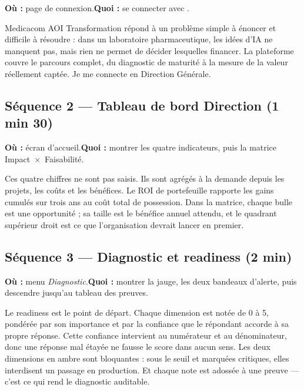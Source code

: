 \textbf{Où :} page de connexion.\quad\textbf{Quoi :} se connecter avec
.

\begin{oral}
Medicacom AOI Transformation répond à un problème simple à énoncer et difficile à
résoudre : dans un laboratoire pharmaceutique, les idées d'IA ne manquent pas, mais rien
ne permet de décider lesquelles financer. La plateforme couvre le parcours complet, du
diagnostic de maturité à la mesure de la valeur réellement captée. Je me connecte en
Direction Générale.
\end{oral}

\subsection*{Séquence 2 — Tableau de bord Direction (1 min 30)}

\textbf{Où :} écran d'accueil.\quad\textbf{Quoi :} montrer les quatre indicateurs, puis
la matrice Impact~$\times$~Faisabilité.

\begin{oral}
Ces quatre chiffres ne sont pas saisis. Ils sont agrégés à la demande depuis les
projets, les coûts et les bénéfices. Le ROI de portefeuille rapporte les gains cumulés
sur trois ans au coût total de possession. Dans la matrice, chaque bulle est une
opportunité ; sa taille est le bénéfice annuel attendu, et le quadrant supérieur droit
est ce que l'organisation devrait lancer en premier.
\end{oral}

\subsection*{Séquence 3 — Diagnostic et readiness (2 min)}

\textbf{Où :} menu \emph{Diagnostic}.\quad\textbf{Quoi :} montrer la jauge, les deux
bandeaux d'alerte, puis descendre jusqu'au tableau des preuves.

\begin{oral}
Le readiness est le point de départ. Chaque dimension est notée de 0 à 5, pondérée par
son importance et par la confiance que le répondant accorde à sa propre réponse. Cette
confiance intervient au numérateur et au dénominateur, donc une réponse mal étayée ne
fausse le score dans aucun sens. Les deux dimensions en ambre sont bloquantes : sous le
seuil et marquées critiques, elles interdisent un passage en production. Et chaque note
est adossée à une preuve — c'est ce qui rend le diagnostic auditable.
\end{oral}

